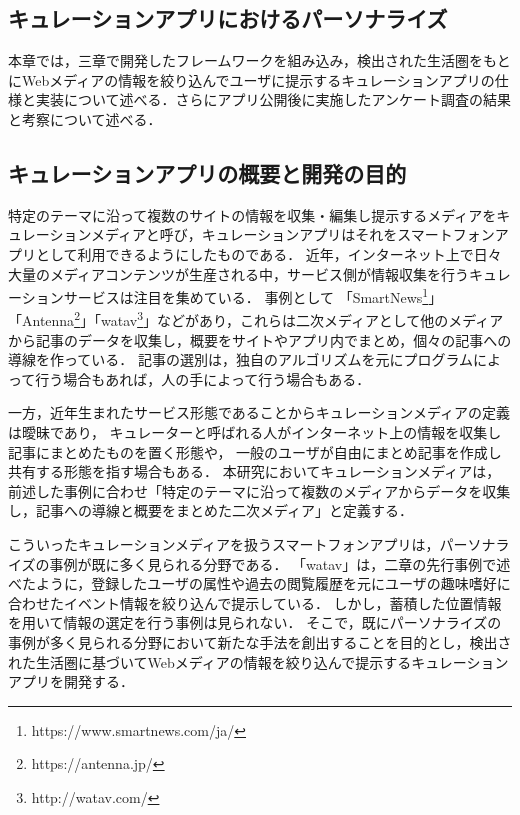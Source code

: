 \documentclass[a4paper]{jsarticle}
\begin{document}
\begin{enumerate}
\begin{enumerate}



\section{キュレーションアプリにおけるパーソナライズ}
本章では，三章で開発したフレームワークを組み込み，検出された生活圏をもとにWebメディアの情報を絞り込んでユーザに提示するキュレーションアプリの仕様と実装について述べる．さらにアプリ公開後に実施したアンケート調査の結果と考察について述べる．


\subsection{キュレーションアプリの概要と開発の目的}
特定のテーマに沿って複数のサイトの情報を収集・編集し提示するメディアをキュレーションメディアと呼び，キュレーションアプリはそれをスマートフォンアプリとして利用できるようにしたものである．
近年，インターネット上で日々大量のメディアコンテンツが生産される中，サービス側が情報収集を行うキュレーションサービスは注目を集めている\cite{ohmukai}．
事例として
「SmartNews\footnote{https://www.smartnews.com/ja/}」「Antenna\footnote{https://antenna.jp/}」「watav\footnote{http://watav.com/}」などがあり，これらは二次メディアとして他のメディアから記事のデータを収集し，概要をサイトやアプリ内でまとめ，個々の記事への導線を作っている．
記事の選別は，独自のアルゴリズムを元にプログラムによって行う場合もあれば，人の手によって行う場合もある．

一方，近年生まれたサービス形態であることからキュレーションメディアの定義は曖昧であり，
キュレーターと呼ばれる人がインターネット上の情報を収集し記事にまとめたものを置く形態や，
一般のユーザが自由にまとめ記事を作成し共有する形態を指す場合もある．
本研究においてキュレーションメディアは，前述した事例に合わせ「特定のテーマに沿って複数のメディアからデータを収集し，記事への導線と概要をまとめた二次メディア」と定義する．

こういったキュレーションメディアを扱うスマートフォンアプリは，パーソナライズの事例が既に多く見られる分野である．
「watav」は，二章の先行事例で述べたように，登録したユーザの属性や過去の閲覧履歴を元にユーザの趣味嗜好に合わせたイベント情報を絞り込んで提示している．
しかし，蓄積した位置情報を用いて情報の選定を行う事例は見られない．
そこで，既にパーソナライズの事例が多く見られる分野において新たな手法を創出することを目的とし，検出された生活圏に基づいてWebメディアの情報を絞り込んで提示するキュレーションアプリを開発する．


\end{enumerate}
\end{enumerate}
\end{document}
